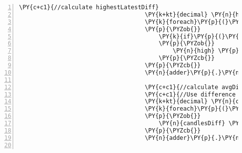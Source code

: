 \begin{Verbatim}[commandchars=\\\{\},numbers=left,firstnumber=1,stepnumber=1,numberblanklines=0]
                                    \PY{c+c1}{//calculate highestLatestDiff}
                                    \PY{k+kt}{decimal} \PY{n}{high} \PY{p}{=} \PY{l+m}{0.00}\PY{n}{M}\PY{p}{;}
                                    \PY{k}{foreach}\PY{p}{(}\PY{n}{Candle} \PY{n}{c} \PY{k}{in} \PY{n}{candles}\PY{p}{)}
                                    \PY{p}{\PYZob{}}
                                        \PY{k}{if}\PY{p}{(}\PY{n}{c}\PY{p}{.}\PY{n}{High} \PY{p}{\PYZgt{}} \PY{n}{high}\PY{p}{)}
                                        \PY{p}{\PYZob{}}
                                            \PY{n}{high} \PY{p}{=} \PY{p}{(}\PY{k+kt}{decimal}\PY{p}{)}\PY{n}{c}\PY{p}{.}\PY{n}{High}\PY{p}{;}
                                        \PY{p}{\PYZcb{}}
                                    \PY{p}{\PYZcb{}}
                                    \PY{n}{adder}\PY{p}{.}\PY{n}{HighestLatestDiff} \PY{p}{=} \PY{p}{(}\PY{k+kt}{decimal}\PY{p}{)}\PY{n}{candles}\PY{p}{.}\PY{n}{Last}\PY{p}{(}\PY{p}{)}\PY{p}{.}\PY{n}{Close} \PY{p}{\PYZhy{}} \PY{n}{high}\PY{p}{;}

                                    \PY{c+c1}{//calculate avgDiff}
                                    \PY{c+c1}{//Use difference between open and close of candles to calculate the average diff}
                                    \PY{k+kt}{decimal} \PY{n}{candlesDiff} \PY{p}{=} \PY{l+m}{0.00}\PY{n}{M}\PY{p}{;}
                                    \PY{k}{foreach}\PY{p}{(}\PY{n}{Candle} \PY{n}{c} \PY{k}{in}  \PY{n}{candles}\PY{p}{)}
                                    \PY{p}{\PYZob{}}
                                        \PY{n}{candlesDiff} \PY{p}{+}\PY{p}{=} \PY{n}{Convert}\PY{p}{.}\PY{n}{ToDecimal}\PY{p}{(}\PY{n}{c}\PY{p}{.}\PY{n}{Close} \PY{p}{\PYZhy{}} \PY{n}{c}\PY{p}{.}\PY{n}{Open}\PY{p}{)}\PY{p}{;}
                                    \PY{p}{\PYZcb{}}
                                    \PY{n}{adder}\PY{p}{.}\PY{n}{avgDiff} \PY{p}{=} \PY{n}{candlesDiff} \PY{p}{/} \PY{n}{candles}\PY{p}{.}\PY{n}{Count}\PY{p}{(}\PY{p}{)}\PY{p}{;}
                                    

\end{Verbatim}
